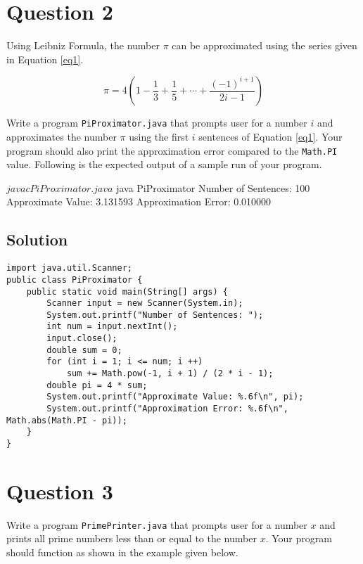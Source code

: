 \documentclass[12pt,letterpaper,twoside]{article}
\begin{document}
\section*{Question 2}

Using Leibniz Formula, the number $\pi$ can be approximated using the series given in Equation \ref{eq1}.

\begin{equation}
\pi = 4 \left( 1 - \frac{1}{3} + \frac{1}{5} + \cdots + \frac{(-1)^{i+1}}{2i-1} \right)
\label{eq1}
\end{equation}

Write a program \texttt{PiProximator.java} that prompts user for a number $i$ and approximates the number $\pi$ using the first $i$ sentences of Equation \ref{eq1}.
Your program should also print the approximation error compared to the \texttt{Math.PI} value.
Following is the expected output of a sample run of your program.

\begin{terminal}
$ javac PiProximator.java
$ java PiProximator
Number of Sentences: 100
Approximate Value: 3.131593
Approximation Error: 0.010000
\end{terminal}

\subsection*{Solution}

\lstset{language=Java,tabsize=2}
\begin{lstlisting}
import java.util.Scanner;
public class PiProximator {
	public static void main(String[] args) {
		Scanner input = new Scanner(System.in);
		System.out.printf("Number of Sentences: ");
		int num = input.nextInt();
		input.close();
		double sum = 0;
		for (int i = 1; i <= num; i ++)
			sum += Math.pow(-1, i + 1) / (2 * i - 1);
		double pi = 4 * sum;
		System.out.printf("Approximate Value: %.6f\n", pi);
		System.out.printf("Approximation Error: %.6f\n", Math.abs(Math.PI - pi));
	}
}
\end{lstlisting}

\section*{Question 3}

Write a program \texttt{PrimePrinter.java} that prompts user for a number $x$ and prints all prime numbers less than or equal to the number $x$.
Your program should function as shown in the example given below.
\end{document}

